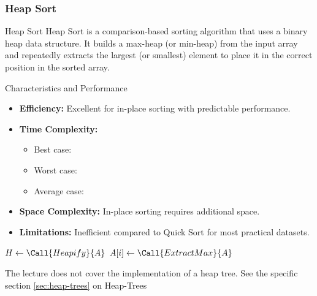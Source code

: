 \newpage
\subsubsection{Heap Sort}
\begin{definition}[]{Heap Sort}
    Heap Sort is a comparison-based sorting algorithm that uses a binary heap data structure. It builds a max-heap (or min-heap) from the input array and repeatedly extracts the largest (or smallest) element to place it in the correct position in the sorted array.
\end{definition}

\begin{properties}[]{Characteristics and Performance}
    \begin{itemize}
        \item \textbf{Efficiency:} Excellent for in-place sorting with predictable performance.
        \item \textbf{Time Complexity:}
              \begin{itemize}
                  \item Best case: 
                  \item Worst case: 
                  \item Average case: 
              \end{itemize}
        \item \textbf{Space Complexity:} In-place sorting requires  additional space.
        \item \textbf{Limitations:} Inefficient compared to Quick Sort for most practical datasets.
    \end{itemize}
\end{properties}

\begin{algorithm}
    \begin{spacing}{1.2}
        \caption{Heap Sort}
        \begin{algorithmic}[1]
                \State $H \gets \Call{Heapify}{A}$
                    \State $A[i] \gets \Call{ExtractMax}{A}$
                \EndFor
            \EndProcedure
        \end{algorithmic}
    \end{spacing}
\end{algorithm}

The lecture does not cover the implementation of a heap tree. See the specific section \ref{sec:heap-trees} on Heap-Trees


